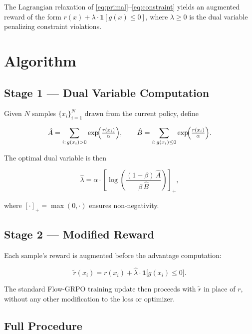 \documentclass[11pt]{article}
\begin{document}
The Lagrangian relaxation of \eqref{eq:primal}--\eqref{eq:constraint} yields an
augmented reward of the form $r(x) + \lambda \cdot \mathbf{1}[g(x) \le 0]$,
where $\lambda \ge 0$ is the dual variable penalizing constraint violations.

\section{Algorithm}

\subsection{Stage 1 — Dual Variable Computation}

Given $N$ samples $\{x_i\}_{i=1}^{N}$ drawn from the current policy, define

\begin{equation}
    \hat{A} = \sum_{i:\,g(x_i) > 0} \exp\!\Bigl(\tfrac{r(x_i)}{\alpha}\Bigr),
    \qquad
    \hat{B} = \sum_{i:\,g(x_i) \le 0} \exp\!\Bigl(\tfrac{r(x_i)}{\alpha}\Bigr).
\end{equation}

The optimal dual variable is then

\begin{equation}
    \hat{\lambda} = \alpha \cdot
    \left[\log\!\left(\frac{(1-\beta)\,\hat{A}}{\beta\,\hat{B}}\right)\right]_{\!+},
    \label{eq:lambda_hat}
\end{equation}

where $[\cdot]_+ = \max(0,\cdot)$ ensures non-negativity.

\subsection{Stage 2 — Modified Reward}

Each sample's reward is augmented before the advantage computation:

\begin{equation}
    \tilde{r}(x_i) = r(x_i) + \hat{\lambda} \cdot \mathbf{1}\bigl[g(x_i) \le 0\bigr].
    \label{eq:modified_reward}
\end{equation}

The standard Flow-GRPO training update then proceeds with $\tilde{r}$ in place
of $r$, without any other modification to the loss or optimizer.

\subsection{Full Procedure}
\end{document}
